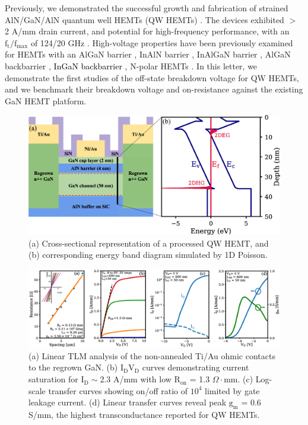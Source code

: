 \documentclass[journal]{IEEEtran}
\begin{document}
Previously, we demonstrated the successful growth and fabrication of strained AlN/GaN/AlN quantum well HEMTs (QW HEMTs) \cite{Wang2012,Islam2016,Song2017}. The devices exhibited $>$ 2 A/mm drain current, and potential for high-frequency performance, with an $\mathrm{f_t}/\mathrm{f_{max}}$ of 124/20 GHz \cite{Song2017}. High-voltage properties have been previously examined for HEMTs with an AlGaN barrier \cite{Chung2010,Hemts2006}, InAlN barrier \cite{Saunier2012,Snider2012}, InAlGaN barrier \cite{Guo2013,Lee2013}, AlGaN backbarrier \cite{Shinohara2010,Shinohara2011,Shinohara2011a,Tang2015}, \textcolor{black}{InGaN backbarrier \cite{YugangZhou2005,Palacios2006}}, N-polar HEMTs \cite{Dasgupta2009,Nidhi2012,Denninghoff2012,Denninghoff2012a,Denninghoff2013,Romanczyk2018}. In this letter, we demonstrate the first studies of the off-state breakdown voltage for QW HEMTs, and we benchmark their breakdown voltage and on-resistance against the existing GaN HEMT platform.
\begin{figure}[!b]
\centering
\includegraphics[width=\columnwidth]{Figure1.eps}
\caption{(a) Cross-sectional representation of a processed QW HEMT, and (b) corresponding energy band diagram simulated by 1D Poisson. }
\label{fig:epi}
\end{figure}

\begin{figure}[!t]
\centering
\includegraphics[width=\textwidth]{Figure2.eps}
\caption{(a) Linear TLM analysis of the non-annealed Ti/Au ohmic contacts to the regrown GaN. (b) $\mathrm{I_DV_D}$ curves demonstrating current saturation for $\mathrm{I_D}\sim$2.3 A/mm with low $\mathrm{R_{on}}$ = 1.3 $\Omega\cdot$mm. (c) Log-scale transfer curves showing on/off ratio of $\mathrm{10^4}$ limited by gate leakage current. (d) Linear transfer curves reveal peak $\mathrm{g_m}$ = 0.6 S/mm, the highest transconductance reported for QW HEMTs. }
\label{fig:IdVg}
\end{figure}
\end{document}
